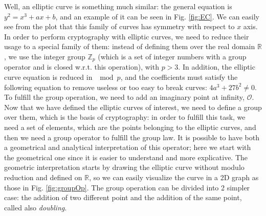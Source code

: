 \documentclass{article}
\begin{document}
 Well, an elliptic curve is something much similar: the general equation is $y^2 = x^3 + ax + b$, and an example of it can be seen in Fig. \ref{fig:EC}. We can easily see from the plot that this family of curves has symmetry with respect to $x$ axis. \newline
 In order to perform cryptography with elliptic curves, we need to reduce their usage to a special family of them: instead of defining them over the real domain $\mathbb{R}$, we use the integer group $\mathbb{Z}_{p}$ (which is a set of integer numbers with a group operator and is closed w.r.t. this operation), with $p > 3$. In addition, the elliptic curve equation is reduced in $\mod p$, and the coefficients must satisfy the following equation to remove useless or too easy to break curves: $4a^3 + 27b^2 \ne{0}$. To fulfill the group operation, we need to add an imaginary point at infinity, $\mathcal{O}$. \newline
 Now that we have defined the elliptic curves of interest, we need to define a group over them, which is the basis of cryptography: in order to fulfill this task, we need a set of elements, which are the points belonging to the elliptic curves, and then we need a group operator to fulfill the group law. It is possible to have both a geometrical and analytical interpretation of this operator; here we start with the geometrical one since it is easier to understand and more explicative.\newline
 The geometric interpretation starts by drawing the elliptic curve without modulo reduction and defined on $\mathbb{R}$, so we can easily visualize the curve in a 2D graph as those in Fig. \ref{fig:groupOp}. The group operation can be divided into 2 simpler case: the addition of two different point and the addition of the same point, called also \textit{doubling}. 
 
\end{document}
